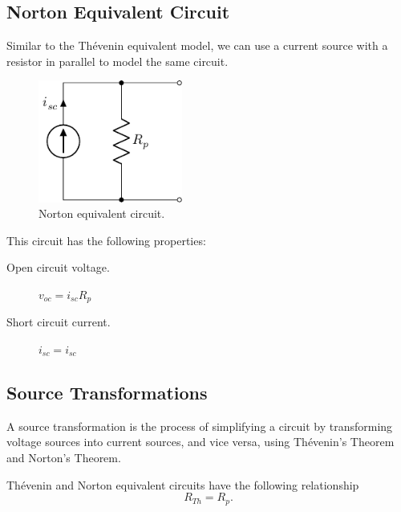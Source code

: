 \documentclass{article}
\begin{document}
\subsection{Norton Equivalent Circuit}
\begin{definition}
    Similar to the Thévenin equivalent model, we can use a current source with
    a resistor in parallel to model the same circuit.
    \begin{figure}[H]
        \centering
        \includegraphics[height = 4cm, keepaspectratio = true]{figures/norton_equivalent.pdf}
        \caption{Norton equivalent circuit.}
    \end{figure}
    This circuit has the following properties:
    \begin{description}
        \item[Open circuit voltage.] \(v_{oc} = i_{sc}R_{p}\)
        \item[Short circuit current.] \(i_{sc} = i_{sc}\)
    \end{description}
\end{definition}
\subsection{Source Transformations}
A source transformation is the process of simplifying a circuit by transforming
voltage sources into current sources, and vice versa, using Thévenin's Theorem and Norton's
Theorem.
\begin{theorem}
    Thévenin and Norton equivalent circuits have the following relationship
    \begin{equation*}
        R_{Th} = R_{p}.
    \end{equation*}
\end{theorem}
\end{document}
